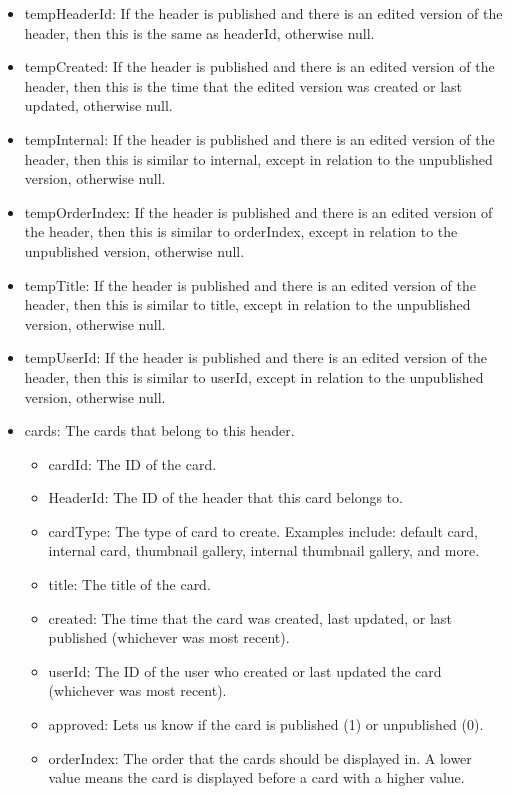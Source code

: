 \documentclass[onecolumn, draftclsnofoot,10pt, compsoc, usenames, dvipsnames]{IEEEtran}
\begin{document}
\begin{itemize}
\begin{itemize}
            \item tempHeaderId: If the header is published and there is an edited version of the header, then this is the same as headerId, otherwise null.
            \item tempCreated: If the header is published and there is an edited version of the header, then this is the time that the edited version was created or last updated, otherwise null.
            \item tempInternal: If the header is published and there is an edited version of the header, then this is similar to internal, except in relation to the unpublished version, otherwise null.
            \item tempOrderIndex: If the header is published and there is an edited version of the header, then this is similar to orderIndex, except in relation to the unpublished version, otherwise null.
            \item tempTitle: If the header is published and there is an edited version of the header, then this is similar to title, except in relation to the unpublished version, otherwise null.
            \item tempUserId: If the header is published and there is an edited version of the header, then this is similar to userId, except in relation to the unpublished version, otherwise null.
            \item cards: The cards that belong to this header.
            \begin{itemize}
                \item cardId: The ID of the card.
                \item HeaderId: The ID of the header that this card belongs to.
                \item cardType: The type of card to create. Examples include: default card, internal card, thumbnail gallery, internal thumbnail gallery, and more.
                \item title: The title of the card.
                \item created: The time that the card was created, last updated, or last published (whichever was most recent).
                \item userId: The ID of the user who created or last updated the card (whichever was most recent).
                \item approved: Lets us know if the card is published (1) or unpublished (0).
                \item orderIndex: The order that the cards should be displayed in. A lower value means the card is displayed before a card with a higher value.

\end{itemize}
\end{itemize}
\end{itemize}
\end{document}
